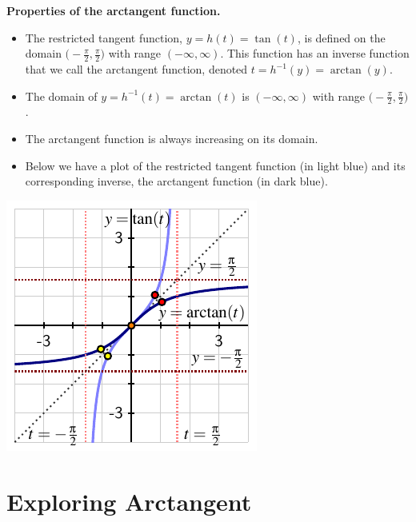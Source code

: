 \documentclass{ximera}
\begin{document}
\begin{callout}{\bf Properties of the arctangent function.}%
\begin{itemize}
\item
The restricted tangent function, $y = h(t) = \tan(t)$, is defined on the domain $\Big(\!\!-\frac{\pi}{2}, \frac{\pi}{2}\Big)$ with range $(-\infty,\infty)$.  This function has an inverse function that we call the arctangent function, denoted $t = h^{-1}(y) = \arctan(y)$.%
\item
The domain of $y = h^{-1}(t) = \arctan(t)$ is $(-\infty,\infty)$ with range $\Big(\!\!-\frac{\pi}{2}, \frac{\pi}{2}\Big)$.%
\item
The arctangent function is always increasing on its domain.%
\item
Below we have a plot of the restricted tangent function (in light blue) and its corresponding inverse, the arctangent function (in dark blue).%
\end{itemize}
\includegraphics[width=1\linewidth]{inverse-trig-arctan-graph.pdf}
\end{callout}

\section{Exploring Arctangent}
\end{document}
